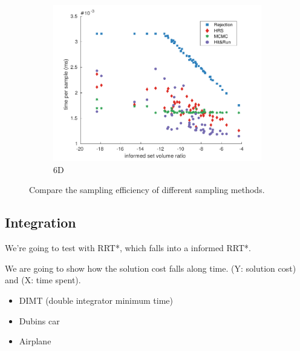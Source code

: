 \documentclass[letterpaper, 10 pt, conference]{ieeeconf}  %
\begin{document}
\begin{figure}[t!]
\begin{subfigure}[b]{0.5\textwidth}
		\includegraphics[width=\linewidth]{fig/sampling_efficiency/sample_efficiency_6d}
		\caption{6D}
		\label{fig:sampling_efficiency:6d}
	\end{subfigure}
	\caption{\captionstyle Compare the sampling efficiency of different sampling methods.}
	\label{fig:sampling_efficiency}
\end{figure} 




\subsection{Integration}

We're going to test with RRT*, which falls into a informed RRT*.

We are going to show how the solution cost falls along time.
(Y: solution cost) and (X: time spent).

\begin{itemize}
\item DIMT (double integrator minimum time)
\item Dubins car
\item Airplane
\end{itemize}
\end{document}
